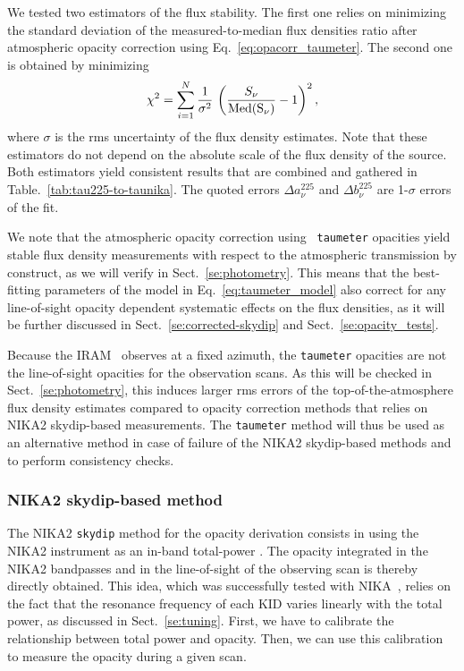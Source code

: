 We tested two estimators of the flux stability. The first one relies
on minimizing the standard deviation of the measured-to-median flux
densities ratio after atmospheric opacity correction using
Eq.~\ref{eq:opacorr_taumeter}. The second one is obtained by minimizing
\begin{equation}
\chi^2 = \sum_{i=1}^{N} \frac{1}{\sigma^2} \, \left( \frac{S_\nu}{\rm{Med}(S_\nu)} -1 \right)^2,  
\end{equation}
where $\sigma$ is the rms uncertainty of the flux density estimates. Note
that these estimators do not depend on
the absolute scale of the flux density of the source. Both estimators
yield consistent results that are combined and gathered in
Table.~\ref{tab:tau225-to-taunika}. The quoted errors
$\Delta a_\nu^{225}$ and $\Delta b_\nu^{225}$ are 1-$\sigma$ errors of
the fit.

{\rev We note that the atmospheric opacity correction using {\tt
taumeter} opacities yield stable flux density measurements with
respect to the atmospheric transmission by construct, as we will
verify in Sect.~\ref{se:photometry}. This means that the best-fitting
parameters of the model in Eq.~\ref{eq:taumeter_model} also correct
for any line-of-sight opacity dependent systematic effects on the flux
densities, as it will be further discussed in
Sect.~\ref{se:corrected-skydip} and Sect.~\ref{se:opacity_tests}.}

Because the IRAM \taumeter\ observes at a fixed azimuth, the
{\tt taumeter} opacities are not the line-of-sight opacities
for the observation scans. As this will be checked in
Sect.~\ref{se:photometry}, this induces larger rms errors of
the top-of-the-atmosphere flux density estimates compared to
opacity correction methods that relies on NIKA2 skydip-based
measurements. The {\tt taumeter} method will thus be used
as an alternative method in case of failure of the NIKA2 skydip-based
methods and to perform consistency checks.


\subsubsection{NIKA2 skydip-based method}
\label{se:skydip-method}

The NIKA2 {\tt skydip} method for the opacity derivation consists in
using the NIKA2 instrument as an in-band total-power \taumeter. {\lp The opacity
integrated in the NIKA2 bandpasses and in the line-of-sight of the
observing scan is thereby directly obtained.} 
This idea,
which was successfully tested with NIKA~\citep{Catalano2014}, relies
on the fact that the resonance frequency of each KID varies linearly
with the total power, as discussed in Sect.~\ref{se:tuning}.
First, we have to calibrate the relationship between total
power and opacity. Then, we can use this calibration to measure the
opacity during a given scan. %


